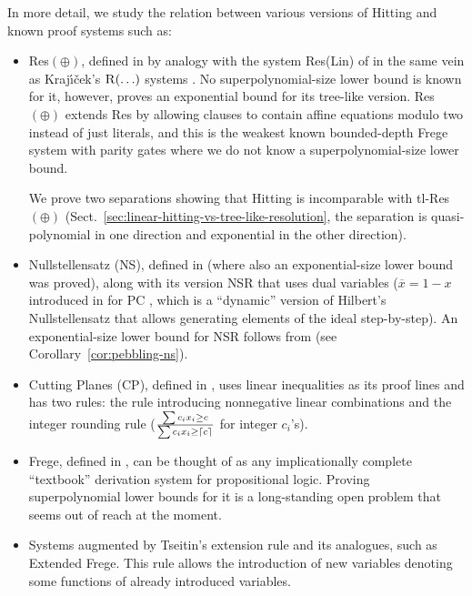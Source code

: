\documentclass[11pt]{article}
\newcommand{\scterm}[1]{{\textrm{\sc #1}}}
\newcommand{\hit}{\scterm{Hitting}}
\newcommand{\tres}{\scterm{tl-Res}}
\newcommand{\res}{\scterm{Res}}
\newcommand{\resp}{{\res}$(\oplus)$}
\newcommand{\tresp}{{\tres}$(\oplus)$}
\newcommand{\rlin}{{\res}\scterm{(Lin)}}
\newcommand{\F}{\scterm{Frege}}
\newcommand{\EF}{\scterm{Extended {\F}}}
\newcommand{\cp}{\scterm{CP}}
\newcommand{\pc}{\scterm{PC}}
\newcommand{\ns}{\scterm{NS}}
\newcommand{\nsr}{\scterm{NSR}}
\newcommand{\olnot}[1]{\overline{#1}}
\numberwithin{equation}{section}
\begin{document}
In more detail, we study the relation between various versions of {\hit} and known proof systems such as:
\begin{itemize}
\item {\resp}, defined in \cite{IS20} by analogy with
the system {\rlin} of \cite{RT08} in the same vein as
Kraj\'{\i}\v{c}ek's $\textsc{R}(\ldots)$ systems \cite{Kra98}.
No superpolynomial-size lower bound is known for it,
however, \cite{IS20} proves an exponential bound for its tree-like version.
{\resp} extends {\res} by
allowing clauses to contain affine equations modulo two
instead of just literals, and this is the weakest known bounded-depth Frege system with parity gates
where we do not know a superpolynomial-size lower bound.

We prove two separations showing that {\hit} is incomparable with {\tresp} (Sect.~\ref{sec:linear-hitting-vs-tree-like-resolution},
the separation is quasi-polynomial in one direction
and exponential in the other direction).

\item Nullstellensatz ({\ns}), defined in \cite{BeameEtAl96} (where also an exponential-size lower bound
was proved),
along with its version {\nsr} \cite{dRLNS21} that uses dual variables
($\olnot{x}=1-x$ introduced in \cite{ABSRW02}
for {\pc} \cite{CEI96}, which is a ``dynamic'' version of Hilbert's Nullstellensatz
that allows generating elements of the ideal step-by-step).
An exponential-size lower bound for {\nsr} follows from \cite{BOPCI00}
(see Corollary~\ref{cor:pebbling-ns}).
\item Cutting Planes ({\cp}), defined in \cite{CCT87}, uses linear inequalities
as its proof lines and has two rules: the rule introducing nonnegative linear combinations
and the integer rounding rule ($\frac{\sum c_ix_i\ge c}{\sum c_ix_i\ge \lceil c\rceil^{\vphantom{W}}}$ for integer $c_i$'s).
\item {\F}, defined in \cite{Rec76,CR79}, can be thought of as any
implicationally complete ``textbook'' derivation system for propositional logic.
Proving superpolynomial lower bounds for it is a long-standing open problem %
that seems out of reach at the moment.
\item Systems augmented by Tseitin's extension rule and its analogues, such as {\EF}.
This rule allows the introduction of new variables denoting some functions
of already introduced variables.
\end{itemize}
\end{document}
